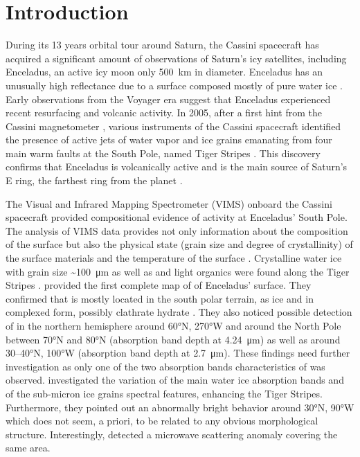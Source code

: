 \documentclass{arxiv-icarus}
\begin{document}

\section{Introduction}

During its 13 years orbital tour around Saturn, the Cassini spacecraft has acquired a significant amount of observations of Saturn's icy satellites, including Enceladus, an active icy moon only \SI{500}{km} in diameter. Enceladus has an unusually high reflectance due to a surface composed mostly of pure water ice \citep{Buratti1984b, Cruikshank2005, Brown2006, Dalton2010}. Early observations from the Voyager era \citep{Smith1982, Squyres1983} suggest that Enceladus experienced recent resurfacing and volcanic activity. In 2005, after a first hint from the Cassini magnetometer \citep{Dougherty2006}, various instruments of the Cassini spacecraft identified the presence of active jets of water vapor and ice grains emanating from four main warm faults at the South Pole, named Tiger Stripes \citep{Hansen2006, Porco2006, Spencer2006, Waite2006}. This discovery confirms that Enceladus is volcanically active and is the main source of Saturn's E ring, the farthest ring from the planet \citep{Spahn2006}.

The Visual and Infrared Mapping Spectrometer (VIMS) onboard the Cassini spacecraft \citep{Brown2004} provided compositional evidence of activity at Enceladus' South Pole. The analysis of VIMS data provides not only information about the composition of the surface but also the physical state (grain size and degree of crystallinity) of the surface materials and the temperature of the surface \citep{Jaumann2008, Taffin2012, Filacchione2016}. Crystalline water ice with grain size \SI{~100}{\um} as well as  and light organics were found along the Tiger Stripes \citep{Brown2006, Jaumann2008, Newman2008, Scipioni2017}. \cite{Combe2019} provided the first complete map of  of Enceladus' surface. They confirmed that  is mostly located in the south polar terrain, as  ice and in complexed form, possibly  clathrate hydrate \citep{Oancea2012}. They also noticed possible detection of  in the northern hemisphere around \ang{60}N, \ang{270}W and around the North Pole between \ang{70}N and \ang{80}N (absorption band depth at \SI{4.24}{\um}) as well as around 30--\ang{40}N, \ang{100}W (absorption band depth at \SI{2.7}{\um}). These findings need further investigation as only one of the two absorption bands characteristics of  was observed. \cite{Scipioni2017} investigated the variation of the main water ice absorption bands and of the sub-micron ice grains spectral features, enhancing the Tiger Stripes. Furthermore, they pointed out an abnormally bright behavior around \ang{30}N, \ang{90}W which does not seem, a priori, to be related to any obvious morphological structure. Interestingly, \cite{Ries2015} detected a microwave scattering anomaly covering the same area.\\
\end{document}
